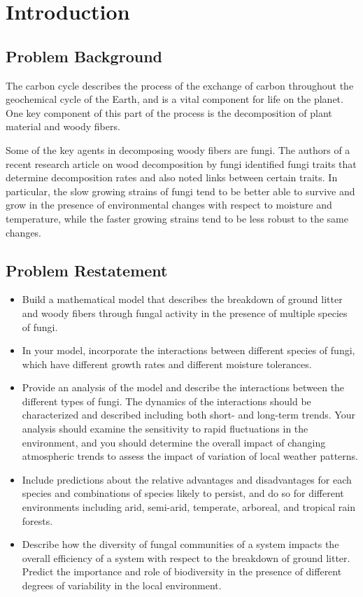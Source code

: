 \section{Introduction}\label{sec:intro}

\subsection{Problem Background}

The carbon cycle describes the process of the exchange of carbon throughout the geochemical cycle of the Earth, and is a vital component for life on the planet. One key component of this part of the process is the decomposition of plant material and woody fibers.

Some of the key agents in decomposing woody fibers are fungi. The authors of a recent research article on wood decomposition by fungi identified fungi traits that determine decomposition rates and also noted links between certain traits. In particular, the slow growing strains of fungi tend to be better able to survive and grow in the presence of environmental changes with respect to moisture and temperature, while the faster growing strains tend to be less robust to the same changes.

\subsection{Problem Restatement}
\begin{itemize}
    \item Build a mathematical model that describes the breakdown of ground litter and woody fibers through fungal activity in the presence of multiple species of fungi.
    \item In your model, incorporate the interactions between different species of fungi, which have different growth rates and different moisture tolerances.
    \item Provide an analysis of the model and describe the interactions between the different types of fungi. The dynamics of the interactions should be characterized and described including both short- and long-term trends. Your analysis should examine the sensitivity to rapid fluctuations in the environment, and you should determine the overall impact of changing atmospheric trends to assess the impact of variation of local weather patterns.
    \item Include predictions about the relative advantages and disadvantages for each species and combinations of species likely to persist, and do so for different environments including arid, semi-arid, temperate, arboreal, and tropical rain forests.
    \item Describe how the diversity of fungal communities of a system impacts the overall efficiency of a system with respect to the breakdown of ground litter. Predict the importance and role of biodiversity in the presence of different degrees of variability in the local environment.
\end{itemize}


